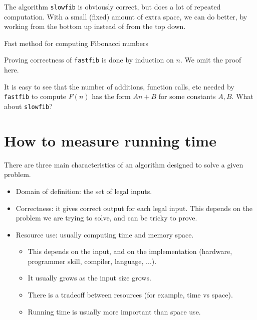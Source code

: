 The algorithm \texttt{slowfib} %
is obviously correct, but does a lot of repeated computation. 
With a small (fixed) amount of extra space, we can do better, by 
working from the bottom up instead of from the top down.

\begin{algorithm}[H]
  \caption{Fast method for computing Fibonacci numbers
    \label{alg:fastfib}}
\begin{algorithmic}[1]
	\Else
		 	
		  
		\EndFor
	\EndIf
	\State {}
\EndFunction
\end{algorithmic}
\end{algorithm}
 
Proving correctness of \texttt{fastfib} is done by induction on $n$.  We omit the proof here.
\begin{Boxample}[6]
It is easy to see that the number of additions, function calls, etc needed by 
\texttt{fastfib} to compute $F(n)$ has the form $An+B$ for some constants $A, B$.
What about \texttt{slowfib}?

\end{Boxample}


\chapter{How to measure running time} %

There are three main characteristics of an algorithm designed to solve a given 
problem.
\begin{itemize}
\item Domain of definition: the set of legal inputs. 
\item Correctness: it gives correct output for each legal input. 
This depends on the problem we are trying to solve, and can be tricky to prove. 
\item Resource use: usually computing time and memory space. 
\begin{itemize} 
\item This depends on the input, and on the implementation 
(hardware, programmer skill, compiler, language, ...). 
\item It usually grows as the input size grows. 
\item There is a tradeoff between resources (for example, time vs space). 
\item Running time is usually more important than space use. 
\end{itemize}
\end{itemize}

